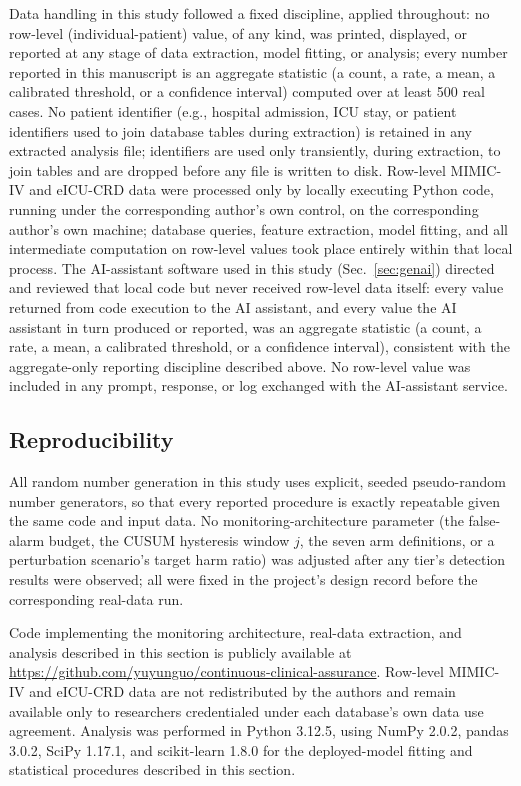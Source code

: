 \documentclass[apajournal,article,submit,oneauthor]{Definitions/mdpi}
\begin{document}
Data handling in this study followed a fixed discipline, applied throughout: no row-level (individual-patient) value, of any kind, was printed, displayed, or reported at any stage of data extraction, model fitting, or analysis; every number reported in this manuscript is an aggregate statistic (a count, a rate, a mean, a calibrated threshold, or a confidence interval) computed over at least 500 real cases. No patient identifier (e.g., hospital admission, ICU stay, or patient identifiers used to join database tables during extraction) is retained in any extracted analysis file; identifiers are used only transiently, during extraction, to join tables and are dropped before any file is written to disk. Row-level MIMIC-IV and eICU-CRD data were processed only by locally executing Python code, running under the corresponding author's own control, on the corresponding author's own machine; database queries, feature extraction, model fitting, and all intermediate computation on row-level values took place entirely within that local process. The AI-assistant software used in this study (Sec.~\ref{sec:genai}) directed and reviewed that local code but never received row-level data itself: every value returned from code execution to the AI assistant, and every value the AI assistant in turn produced or reported, was an aggregate statistic (a count, a rate, a mean, a calibrated threshold, or a confidence interval), consistent with the aggregate-only reporting discipline described above. No row-level value was included in any prompt, response, or log exchanged with the AI-assistant service.

\subsection{Reproducibility}\label{sec:reproducibility}

All random number generation in this study uses explicit, seeded pseudo-random number generators, so that every reported procedure is exactly repeatable given the same code and input data. No monitoring-architecture parameter (the false-alarm budget, the CUSUM hysteresis window $j$, the seven arm definitions, or a perturbation scenario's target harm ratio) was adjusted after any tier's detection results were observed; all were fixed in the project's design record before the corresponding real-data run.

Code implementing the monitoring architecture, real-data extraction, and analysis described in this section is publicly available at \url{https://github.com/yuyunguo/continuous-clinical-assurance}. Row-level MIMIC-IV and eICU-CRD data are not redistributed by the authors and remain available only to researchers credentialed under each database's own data use agreement. Analysis was performed in Python 3.12.5, using NumPy 2.0.2, pandas 3.0.2, SciPy 1.17.1, and scikit-learn 1.8.0 for the deployed-model fitting and statistical procedures described in this section.
\end{document}
